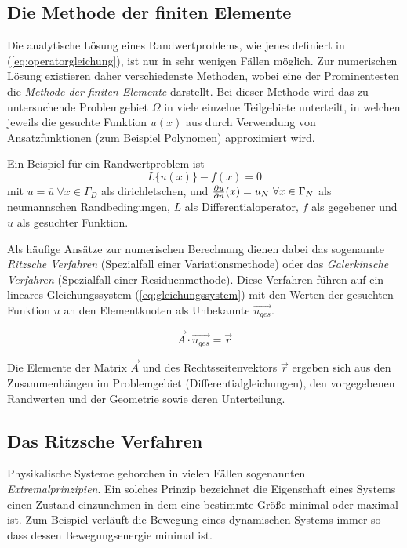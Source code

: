 \subsection{Die Methode der finiten Elemente}
\label{sec:fem_theory}
Die analytische Lösung eines Randwertproblems, wie jenes definiert in (\ref{eq:operatorgleichung}), ist nur in sehr wenigen Fällen möglich. Zur numerischen Lösung existieren daher verschiedenste Methoden, wobei eine der Prominentesten die \textit{Methode der finiten Elemente} darstellt. Bei dieser Methode wird das zu untersuchende Problemgebiet $\Omega$ in viele einzelne Teilgebiete unterteilt, in welchen jeweils die gesuchte Funktion $u(x)$ aus durch Verwendung von Ansatzfunktionen (zum Beispiel Polynomen) approximiert wird. \newline

Ein Beispiel für ein Randwertproblem ist
\begin{equation}
L\{u(x)\} - f(x) = 0
\label{eq:operatorgleichung}
\end{equation}
mit $u = \overline{u} \ \forall x\in \Gamma_D$ als dirichletschen, und $\frac{\partial u}{\partial n}(x) = u_N \ \forall x \in \Gamma_N $ als neumannschen Randbedingungen, $L$ als Differentialoperator, $f$ als gegebener und $u$ als gesuchter Funktion.\newline

Als häufige Ansätze zur numerischen Berechnung dienen dabei das sogenannte \textit{Ritzsche Verfahren} (Spezialfall einer Variationsmethode) oder das \textit{Galerkinsche Verfahren} (Spezialfall einer Residuenmethode). Diese Verfahren führen auf ein lineares Gleichungssystem (\ref{eq:gleichungssystem}) mit den Werten der gesuchten Funktion $u$ an den Elementknoten als Unbekannte $\vec{u_{ges}}$.

\begin{equation}
\vec{A} \cdot \vec{u_{ges}} = \vec{r}
\label{eq:gleichungssystem}
\end{equation}

Die Elemente der Matrix $\vec{A}$ und des Rechtsseitenvektors $\vec{r}$ ergeben sich aus den Zusammenhängen im Problemgebiet (Differentialgleichungen), den vorgegebenen Randwerten und der Geometrie sowie deren Unterteilung.\newline

\subsection{Das Ritzsche Verfahren}
Physikalische Systeme gehorchen in vielen Fällen sogenannten \textit{Extremalprinzipien}. Ein solches Prinzip bezeichnet die Eigenschaft eines Systems einen Zustand einzunehmen in dem eine bestimmte Größe minimal oder maximal ist. Zum Beispiel verläuft die Bewegung eines dynamischen Systems immer so dass dessen Bewegungsenergie minimal ist.\newline

